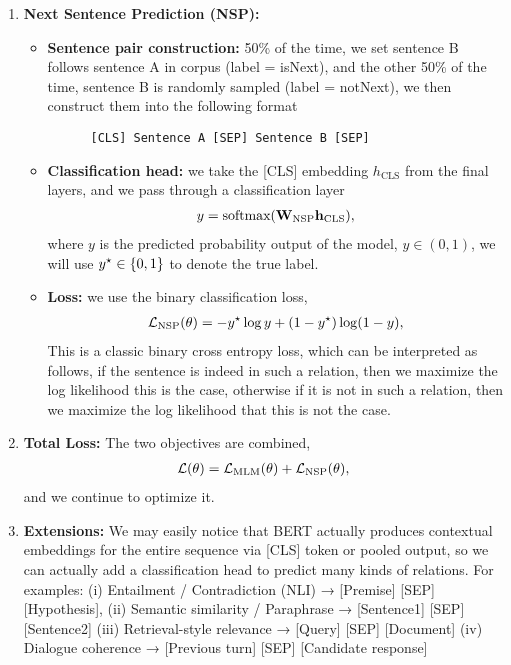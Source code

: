 \documentclass[11pt]{article}  %
\begin{document}
\begin{enumerate}
  \item \textbf{Next Sentence Prediction (NSP):}
  \begin{itemize}
    \item \textbf{Sentence pair construction:} 50\% of the time, we set sentence B follows sentence A in corpus (label = isNext), and the other 50\% of the time, sentence B is randomly sampled (label = notNext), we then construct them into the following format 
    \begin{verbatim}
      [CLS] Sentence A [SEP] Sentence B [SEP]
    \end{verbatim}

    \item \textbf{Classification head:} we take the [CLS] embedding $h_{\text{CLS}}$ from the final layers, and we pass through a classification layer
    \begin{align*}
      y = \text{softmax}(\mathbf{W}_{\text{NSP}}\mathbf{h}_{\text{CLS}}),
    \end{align*}
    where $y$ is the predicted probability output of the model, $y \in (0, 1)$, we will use $y^\star \in \left\{ 0, 1 \right\}$ to denote the true label.

    \item \textbf{Loss:} we use the binary classification loss, 
    \begin{align*}
      \mathcal{L}_{\text{NSP}}(\theta) = -y^\star \log y + (1 - y^\star) \log (1 - y), 
    \end{align*} 
    This is a classic binary cross entropy loss, which can be interpreted as follows, if the sentence is indeed in such a relation, then we maximize the log likelihood this is the case, otherwise if it is not in such a relation, then we maximize the log likelihood that this is not the case.
  \end{itemize}

  \item \textbf{Total Loss:} 
  The two objectives are combined, 
  \begin{align*}
    \mathcal{L}(\theta) = \mathcal{L}_{\text{MLM}}(\theta) + \mathcal{L}_{\text{NSP}}(\theta),
  \end{align*}
  and we continue to optimize it.
  
  \item \textbf{Extensions:} 
  We may easily notice that BERT actually produces contextual embeddings for the entire sequence via [CLS] token or pooled output, so we can actually add a classification head to predict many kinds of relations. 
  For examples: (i) Entailment / Contradiction (NLI) → [Premise] [SEP] [Hypothesis], (ii) Semantic similarity / Paraphrase → [Sentence1] [SEP] [Sentence2] (iii) Retrieval-style relevance → [Query] [SEP] [Document] (iv) Dialogue coherence → [Previous turn] [SEP] [Candidate response]


\end{enumerate}
\end{document}
